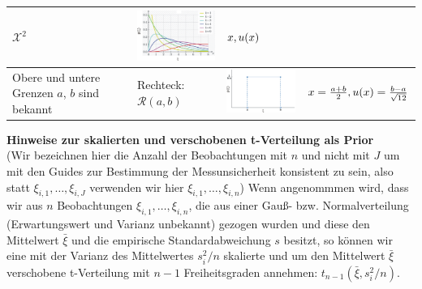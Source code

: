 \begin{table}[!htbp]
\begin{tabular}{m{3cm} |m{3cm} m{4.5cm}| m{3cm}}
	 $\mathcal{X}^2 $ &
	 \includegraphics[width=40mm]{12_vorlesung_GUMS2/media/Prior_Chi2verteilung.png}
	 & $x, \newline u(x) $ \\
	  \hline \vspace*{4ex}
	Obere und untere Grenzen $a$, $b$ sind bekannt \vspace*{4ex} &
	Rechteck: $\mathcal{R}(a,b)$ &
	\includegraphics[width=40mm]{12_vorlesung_GUMS2/media/Prior_Rechteckverteilung.png}
	& $x = \frac{a+b}{2}, \newline u(x)=\frac{b-a}{\sqrt{12}} $ \\

		\hline
	\end{tabular}
	\label{tab:Einige_Priors}
\end{table}

\newpage
\textbf{Hinweise zur skalierten und verschobenen t-Verteilung als Prior} \\
(Wir bezeichnen hier die Anzahl der Beobachtungen mit $n$ und nicht mit $J$ um mit den Guides
zur Bestimmung der Messunsicherheit konsistent zu sein, also statt $\xi_{i,1}, \dots, \xi_{i,J}$ verwenden wir hier $\xi_{i,1}, \dots, \xi_{i,n}$)
Wenn angenommmen wird, dass wir aus $n$ Beobachtungen  $\xi_{i,1},\ldots,\xi_{i,n}$, die aus einer Gauß- bzw.
Normalverteilung (Erwartungswert und Varianz unbekannt) gezogen wurden und diese den Mittelwert $\bar{\xi}$
und die empirische Standardabweichung $s$ besitzt,
so können wir eine mit der Varianz des Mittelwertes $s_i^2/n$ skalierte und
um den Mittelwert $\bar \xi$ verschobene t-Verteilung mit $n-1$ Freiheitsgraden
annehmen: $t_{n-1}(\bar \xi, s_i^2/n)$.


